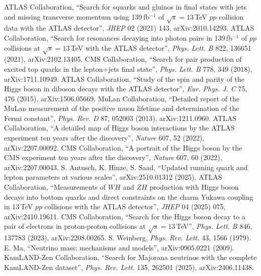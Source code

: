  ATLAS Collaboration, ``Search for squarks and gluinos in final states with jets and missing transverse momentum using
139\,fb$^{-1}$ of $\sqrt{s}=13$\,TeV $pp$ collision data with the ATLAS detector'', \emph{JHEP} 02 (2021) 143, arXiv:2010.14293.
 ATLAS Collaboration, ``Search for resonances decaying into photon pairs in 139\,fb$^{-1}$ of $pp$ collisions at
$\sqrt{s}=13$\,TeV with the ATLAS detector'', \emph{Phys. Lett. B} 822, 136651 (2021), arXiv:2102.13405.
 CMS Collaboration, ``Search for pair production of excited top quarks in the lepton+jets final state'', \emph{Phys. Lett. B}
778, 349 (2018), arXiv:1711.10949.
 ATLAS Collaboration, ``Study of the spin and parity of the Higgs boson in diboson decays with the ATLAS detector'',
\emph{Eur. Phys. J. C} 75, 476 (2015), arXiv:1506.05669.
 MuLan Collaboration, ``Detailed report of the MuLan measurement of the positive muon lifetime and determination of the
Fermi constant'', \emph{Phys. Rev. D} 87, 052003 (2013), arXiv:1211.0960.
 ATLAS Collaboration, ``A detailed map of Higgs boson interactions by the ATLAS experiment ten years after the discovery'',
\emph{Nature} 607, 52 (2022), arXiv:2207.00092.
 CMS Collaboration, ``A portrait of the Higgs boson by the CMS experiment ten years after the discovery'', \emph{Nature} 607,
60 (2022), arXiv:2207.00043.
 S. Antusch, K. Hinze, S. Saad, ``Updated running quark and lepton parameters at various scales'', arXiv:2510.01312 (2025).
 ATLAS Collaboration, ``Measurements of $WH$ and $ZH$ production with Higgs boson decays into bottom quarks and direct
constraints on the charm Yukawa coupling in 13\,TeV $pp$ collisions with the ATLAS detector'', \emph{JHEP} 04 (2025) 075, arXiv:2410.19611.
 CMS Collaboration, ``Search for the Higgs boson decay to a pair of electrons in proton-proton collisions at
$\sqrt{s}=13$\,TeV'', \emph{Phys. Lett. B} 846, 137783 (2023), arXiv:2208.00265.
 S. Weinberg, \emph{Phys. Rev. Lett.} 43, 1566 (1979).
 E. Ma, ``Neutrino mass: mechanisms and models'', arXiv:0905.0221 (2009).
 KamLAND-Zen Collaboration, ``Search for Majorana neutrinos with the complete KamLAND-Zen dataset'', \emph{Phys. Rev.
Lett.} 135, 262501 (2025), arXiv:2406.11438.
